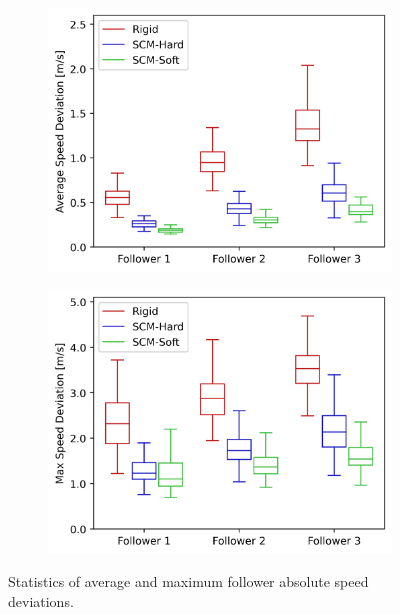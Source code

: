 \documentclass[12pt,twocolumn]{article}
\begin{document}
\begin{figure}
    \centering
    \begin{subfigure}{0.45\textwidth}
        \includegraphics[width=\columnwidth]{Figs/StatisticalAnalysis/metric_speed_avg.png}
        \caption{} \label{fig:metricspeedavg}
    \end{subfigure}
    \begin{subfigure}{0.45\textwidth}
        \includegraphics[width=\columnwidth]{Figs/StatisticalAnalysis/metric_speed_max.png}
        \caption{} \label{fig:metricspeedmax}
    \end{subfigure}%
    \caption{Statistics of average and maximum follower absolute speed deviations.}  
    \label{fig:metricspeed}
\end{figure}
\end{document}
